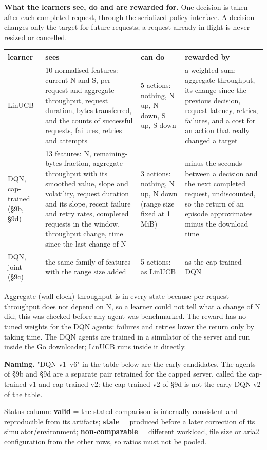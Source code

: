 \documentclass[10pt,a4paper]{article}
\begin{document}
\textbf{What the learners see, do and are rewarded for.} One decision is taken after each completed request, through the serialized policy interface. A decision changes only the target for future requests; a request already in flight is never resized or cancelled.


{\small\begin{tabularx}{\linewidth}{@{}LLLL@{}}
\toprule
\textbf{learner} & \textbf{sees} & \textbf{can do} & \textbf{rewarded by}\\
\midrule
LinUCB & 10 normalised features: current N and S, per-request and aggregate throughput, request duration, bytes transferred, and the counts of successful requests, failures, retries and attempts & 5 actions: nothing, N up, N down, S up, S down & a weighted sum: aggregate throughput, its change since the previous decision, request latency, retries, failures, and a cost for an action that really changed a target\\
DQN, cap-trained (§9b, §9d) & 13 features: N, remaining-bytes fraction, aggregate throughput with its smoothed value, slope and volatility, request duration and its slope, recent failure and retry rates, completed requests in the window, throughput change, time since the last change of N & 3 actions: nothing, N up, N down (range size fixed at 1 MiB) & minus the seconds between a decision and the next completed request, undiscounted, so the return of an episode approximates minus the download time\\
DQN, joint (§9c) & the same family of features with the range size added & 5 actions: as LinUCB & as the cap-trained DQN\\
\bottomrule
\end{tabularx}}


Aggregate (wall-clock) throughput is in every state because per-request throughput does not depend on N, so a learner could not tell what a change of N did; this was checked before any agent was benchmarked. The reward has no tuned weights for the DQN agents: failures and retries lower the return only by taking time. The DQN agents are trained in a simulator of the server and run inside the Go downloader; LinUCB runs inside it directly.


\textbf{Naming.} "DQN v1–v6" in the table below are the early candidates. The agents of §9b and §9d are a separate pair retrained for the capped server, called the cap-trained v1 and cap-trained v2: the cap-trained v2 of §9d is not the early DQN v2 of the table.


Status column: \textbf{valid} = the stated comparison is internally consistent and reproducible from its artifacts; \textbf{stale} = produced before a later correction of its simulator/environment; \textbf{non-comparable} = different workload, file size or aria2 configuration from the other rows, so ratios must not be pooled.
\end{document}

